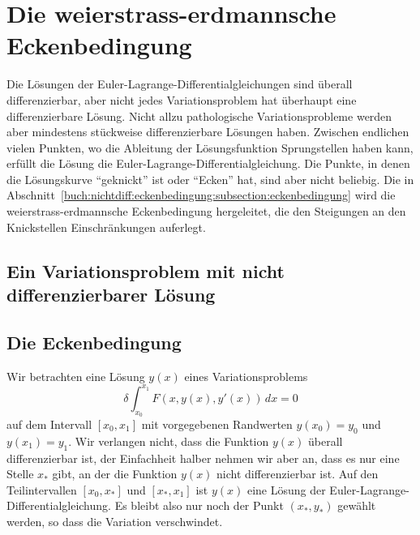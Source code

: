 %
%
%
\section{Die weierstrass-erdmannsche Eckenbedingung
\label{buch:nichtdiff:section:ecken}}
Die Lösungen der Euler-Lagrange-Differentialgleichungen sind überall
differenzierbar, aber nicht jedes Variationsproblem hat überhaupt
eine differenzierbare Lösung.
Nicht allzu pathologische Variationsprobleme werden aber mindestens
stückweise differenzierbare Lösungen haben.
Zwischen endlichen vielen Punkten, wo die Ableitung der Lösungsfunktion
Sprungstellen haben kann, erfüllt die Lösung die
Euler-Lagrange-Differentialgleichung.
Die Punkte, in denen die Lösungskurve ``geknickt'' ist oder ``Ecken''
hat, sind aber nicht beliebig.
Die in Abschnitt~\ref{buch:nichtdiff:eckenbedingung:subsection:eckenbedingung}
wird die weierstrass-erdmannsche Eckenbedingung hergeleitet, die
den Steigungen an den Knickstellen Einschränkungen auferlegt.

%
%
\subsection{Ein Variationsproblem mit nicht differenzierbarer Lösung}

%
%
\subsection{Die Eckenbedingung
\label{buch:nichtdiff:eckenbedingung:subsection:eckenbedingung}}
Wir betrachten eine Lösung $y(x)$ eines Variationsproblems 
\[
\delta
\int_{x_0}^{x_1}
F(x,y(x),y'(x))
\,dx
=
0
\]
auf dem Intervall $[x_0,x_1]$ mit vorgegebenen Randwerten 
$y(x_0)=y_0$ und $y(x_1)=y_1$.
Wir verlangen nicht, dass die Funktion $y(x)$ überall differenzierbar
ist, der Einfachheit halber nehmen wir aber an, dass es nur eine
Stelle $x_*$ gibt, an der die Funktion $y(x)$ nicht differenzierbar ist.
Auf den Teilintervallen $[x_0,x_*]$ und $[x_*,x_1]$ ist $y(x)$ eine
Lösung der Euler-Lagrange-Differentialgleichung.
Es bleibt also nur noch der Punkt $(x_*,y_*)$ gewählt werden, so dass
die Variation verschwindet.

